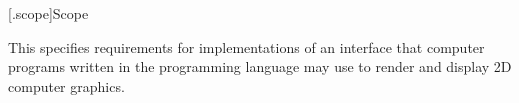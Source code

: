 
[\iotwod.scope]{Scope}

\pnum
{}%
This \documenttypename{} specifies requirements for implementations
of an interface that computer programs written in the \Cpp programming
language may use to render and display 2D computer graphics.

